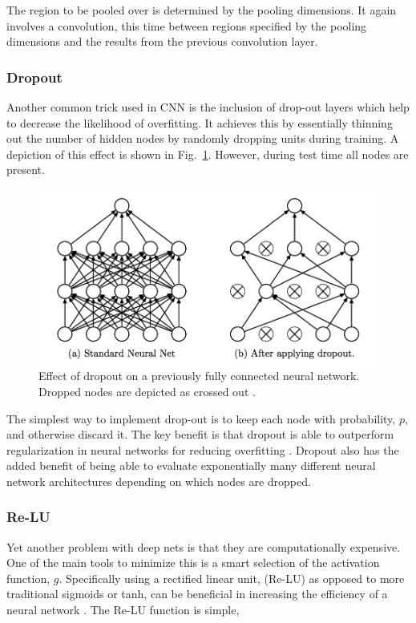 \documentclass[12pt, twocolumn]{article}
\begin{document}
The region to be pooled over is determined by the pooling dimensions. It again involves a convolution, this time between regions specified by the pooling dimensions and the results from the previous convolution layer. 

\subsubsection{Dropout}

Another common trick used in CNN is the inclusion of drop-out layers which help to decrease the likelihood of overfitting. It achieves this by essentially thinning out the number of hidden nodes by randomly dropping units during training.  A depiction of this effect is shown in Fig.~\ref{fig:dropout}. However, during test time all nodes are present. 
\begin{figure}
\includegraphics[scale=.52]{dropout.png}

\caption{Effect of dropout on a previously fully connected neural network. Dropped nodes are depicted as crossed out \cite{Dropout}. }
\label{fig:dropout}
\end{figure}

The simplest way to implement drop-out is to keep each node with probability, $p$, and otherwise discard it. The key benefit is that dropout is able to outperform regularization in neural networks for reducing overfitting \cite{Dropout}. Dropout also has the added benefit of being able to evaluate exponentially many different neural network architectures depending on which nodes are dropped.
 
\subsubsection{Re-LU}

Yet another problem with deep nets is that they are computationally expensive. One of the main tools to minimize this is a smart selection of the activation function, $g$. Specifically using a rectified linear unit, (Re-LU) as opposed to more traditional sigmoids or tanh, can be beneficial in increasing the efficiency of a neural network \cite{imagenet}. The Re-LU function is simple, 
\end{document}
